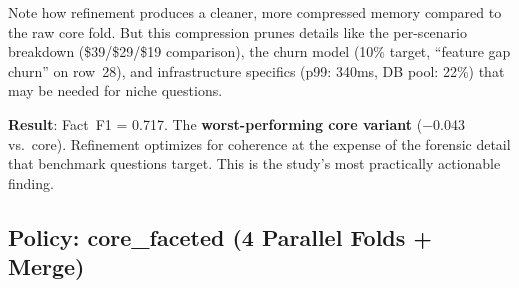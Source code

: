 \documentclass[11pt,a4paper]{article}
\begin{document}
Note how refinement produces a cleaner, more compressed memory compared to the raw core fold. But this compression prunes details like the per-scenario breakdown (\$39/\$29/\$19 comparison), the churn model (10\% target, ``feature gap churn'' on row~28), and infrastructure specifics (p99: 340ms, DB pool: 22\%) that may be needed for niche questions.

\textbf{Result}: Fact~F1 = 0.717. The \textbf{worst-performing core variant} ($-$0.043 vs.\ core). Refinement optimizes for coherence at the expense of the forensic detail that benchmark questions target. This is the study's most practically actionable finding.

\subsection{Policy: core\_faceted (4 Parallel Folds + Merge)}
\end{document}
